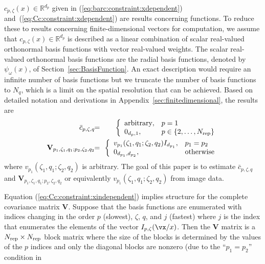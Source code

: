 $c_{p,\zeta}(x)\in\mathbb{R}^{d_p}$ given in
(\ref{eq:barc:constraint:xdependent}) and~(\ref{eq:Cc:constraint:xdependent})
are results concerning functions.
To reduce these to results concerning finite-dimensional vectors for
computation, we assume
that $c_{p,\zeta}(x)\in\mathbb{R}^{d_p}$ is described as a linear combination
of scalar real-valued orthonormal basis functions with vector real-valued
weights.
The scalar real-valued orthonormal basis functions are the radial basis
functions, denoted by $\psi_\omega(x)$, of Section~\ref{sec:BasisFunction}.
An exact description would require an infinite number of basis functions
but we truncate the number of basis functions to $N_q$, which is a limit on
the spatial resolution that can be achieved.
Based on detailed notation and derivations in
Appendix~\ref{sec:finitedimensional},
the results are
\begin{eqnarray}
\bar c_{p,\zeta,q}
\!\!
&=&
\!\!
\left\{
\begin{array}{ll}
\mbox{arbitrary}, & p=1 \\
0_{d_p,1}, & p\in\{2,\dots,\Nirrep\}
\end{array}
\right.
\label{eq:barc:constraint:xindependent}
\\
\mathbf{V}_{p_1,\zeta_1,q_1;p_2,\zeta_2,q_2}
\!\!
&=&
\!\!
\left\{
\begin{array}{ll}
v_{p_1}(\zeta_1,q_1;\zeta_2,q_2)
I_{d_{p_1}}
,
&
p_1=p_2
\\
0_{d_{p_1},d_{p_2}}
,
&
\mbox{otherwise}
\end{array}
\right.
\label{eq:Cc:constraint:xindependent}
\end{eqnarray}
where $v_{p_1}(\zeta_1,q_1;\zeta_2,q_2)$ is arbitrary.
The goal of this paper is to estimate $\bar c_{p,\zeta,q}$ and
$\mathbf{V}_{p_1,\zeta_1,q_1;p_2,\zeta_2,q_2}$ or equivalently
$v_{p_1}(\zeta_1,q_1;\zeta_2,q_2)$ from image data.
\par
Equation (\ref{eq:Cc:constraint:xindependent}) %
implies structure for the complete
covariance matrix $\mathbf{V}$.
Suppose that the basis functions are enumerated with indices changing in
the order $p$ (slowest), $\zeta$, $q$, and $j$ (fastest) where $j$ is the
index that enumerates the elements of the vector $I_{p,\zeta}(\vx/x)$.
Then the $\mathbf{V}$ matrix is a $N_{\rm rep}\times N_{\rm rep}$ block matrix where the size
of the blocks is determined by the values of the $p$ indices and only the
diagonal blocks are nonzero (due to the ``$p_1=p_2$'' condition in
